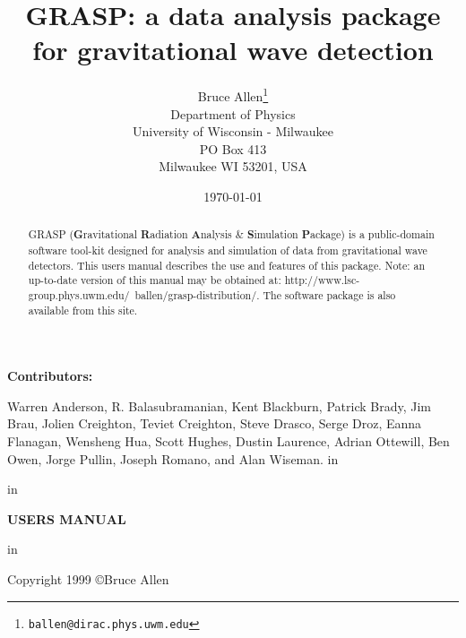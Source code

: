 \documentclass[11pt]{article}
\date{\today}
\begin{document}
\title{GRASP: a data analysis package for gravitational wave detection}
\author{Bruce Allen\thanks{\tt ballen@dirac.phys.uwm.edu}\\
Department of Physics\\
University of Wisconsin - Milwaukee\\
PO Box 413\\
Milwaukee WI 53201, USA}

\maketitle

\begin{center}
{\bf Contributors:}
\end{center}
Warren Anderson,
R. Balasubramanian,
Kent Blackburn,
Patrick Brady,
Jim Brau,
Jolien Creighton,
Teviet Creighton,
Steve Drasco,
Serge Droz,
Eanna Flanagan,
Wensheng Hua,
Scott Hughes,
Dustin Laurence,
Adrian Ottewill,
Ben Owen,
Jorge Pullin,
Joseph Romano, and
Alan Wiseman.
 in

\begin{abstract}
\noindent
GRASP ({\bf G}ravitational {\bf R}adiation {\bf A}nalysis \& {\bf
S}imulation {\bf P}ackage) is a public-domain software tool-kit designed
for analysis and simulation of data from gravitational wave detectors.
This users manual describes the use and features of this package.
Note: an up-to-date version of this manual may be obtained at:
{http://www.lsc-group.phys.uwm.edu/~ballen/grasp-distribution/}.
The software package is also available from this site.
\end{abstract}
 in \centerline{\bf USERS MANUAL}
 in

\begin{center}
Copyright 1999 \copyright Bruce Allen
\end{center}
\vskip 0.5in
\begin{center}
{\bf \versionnumber}
\end{center}
\clearpage
{}
\tableofcontents
\clearpage
\chead{\bf \leftmark}
\end{document}
